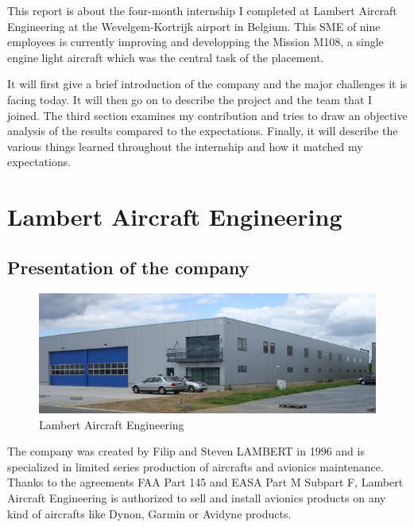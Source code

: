 \documentclass[11pt,a4paper]{article}
\begin{document}
\bigskip

This report is about the four-month internship I completed at Lambert Aircraft Engineering at the Wevelgem-Kortrijk airport in Belgium. This SME of nine employees is currently improving and developping the Mission M108, a single engine light aircraft which was the central task of the placement.

\bigskip

It will first give a brief introduction of the company and the major challenges it is facing today. It will then go on to describe the project and the team that I joined. The third section examines my contribution and tries to draw an objective analysis of the results compared to the expectations. Finally, it will describe the various things learned throughout the internship and how it matched my expectations.

\newpage

\section{Lambert Aircraft Engineering}

\subsection{Presentation of the company}

\begin{figure}[ht!]
	\begin{center}
		\includegraphics[width=15cm]{pics/PIC001.jpg}
		\caption{Lambert Aircraft Engineering}
		\label{fig:PIC001}
	\end{center}
\end{figure}

The company was created by Filip and Steven LAMBERT in 1996 and is specialized in limited series production of aircrafts and avionics maintenance. Thanks to the agreements FAA Part 145 and EASA Part M Subpart F, Lambert Aircraft Engineering is authorized to sell and install avionics products on any kind of aircrafts like Dynon, Garmin or Avidyne products.
\end{document}
